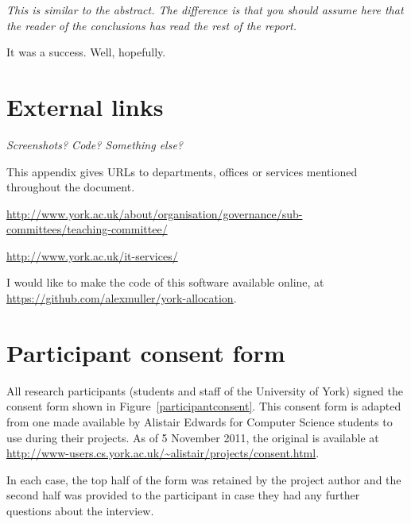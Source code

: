 \documentclass[]{scrartcl}
\begin{document}
\textit{This is similar to the abstract. The difference is that you should assume here that the reader of the conclusions has read the rest of the report.}

It was a success. Well, hopefully.

\appendix

\newpage
\section{External links}

\textit{Screenshots? Code? Something else?}

This appendix gives URLs to departments, offices or services mentioned throughout the document.

\url{http://www.york.ac.uk/about/organisation/governance/sub-committees/teaching-committee/}

\url{http://www.york.ac.uk/it-services/}

I would like to make the code of this software available online, at \url{https://github.com/alexmuller/york-allocation}.

\newpage
\section{Participant consent form}

All research participants (students and staff of the University of York) signed the consent form shown in Figure~\ref{participantconsent}. This consent form is adapted from one made available by Alistair Edwards for Computer Science students to use during their projects. As of 5 November 2011, the original is available at \url{http://www-users.cs.york.ac.uk/~alistair/projects/consent.html}.

In each case, the top half of the form was retained by the project author and the second half was provided to the participant in case they had any further questions about the interview.
\end{document}
